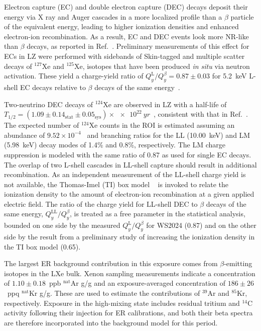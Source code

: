 \documentclass[%
 reprint,
 superscriptaddress,
 amsmath,amssymb,
 prl,
floatfix,
]{revtex4-2}
\newcommand{\RevA}[1]{{\color{black}#1}}
\begin{document}
Electron capture (EC) and double electron capture (DEC) decays deposit their energy via X ray and Auger cascades in a more localized profile than a $\beta$ particle of the equivalent energy, leading to higher ionization densities and enhanced electron-ion recombination. As a result, EC and DEC events look more NR-like than $\beta$ decays, as reported in Ref.~\cite{Xelda-Lshell}. Preliminary measurements of this effect for ECs in LZ were performed with sidebands of Skin-tagged and multiple scatter decays of $^{127}$Xe and $^{125}$Xe, isotopes that have been produced \textit{in situ} via neutron activation. These yield a charge-yield ratio of $Q_y^\text{L} / Q_y^\beta=0.87\pm0.03$ for 5.2~keV L-shell EC decays relative to $\beta$ decays of the same energy~\cite{aalbers2025measurementsmodelsenhancedrecombination}.

Two-neutrino DEC decays of $^{124}$Xe are observed in LZ with a half-life of ${T_{1/2} = (1.09 \pm 0.14_{\text{stat}} \pm 0.05_{\text{sys}}) \times \qty{e22}{yr}}$~\cite{LZ-Xe124}, consistent with that in Ref.~\cite{XENONnT-Xe124_Xe136-2022}. The expected number of $^{124}$Xe counts in the ROI is estimated assuming an abundance of $9.52\times10^{-4}$~\cite{XeAbundances} and branching ratios for the LL (10.00~keV) and LM (5.98~keV) decay modes of 1.4\% and 0.8\%, respectively. The LM charge suppression is modeled with the same ratio of 0.87 as used for single EC decays. The overlap of two L-shell cascades in LL-shell capture should result in additional recombination. As an independent measurement of the LL-shell charge yield is not available, the Thomas-Imel (TI) box model ~\cite{thomas1987recombination, szydagis2022review} is invoked to relate the ionization density to the amount of electron-ion recombination at a given applied electric field. The ratio of the charge yield for LL-shell DEC to $\beta$ decays of the same energy, $Q_y^\text{LL} / Q_y^\beta$, is treated as a free parameter in the statistical analysis, bounded on one side by the measured $Q_y^\text{L} / Q_y^\beta$ for WS2024 (0.87) and on the other side by the result from a preliminary study of increasing the ionization density in the TI box model (0.65).

The largest ER background contribution in this exposure comes from $\beta$-emitting isotopes in the LXe bulk. Xenon sampling measurements indicate a concentration of $1.10\pm0.18$~ppb $^\text{nat}$Ar g/g and an exposure-averaged concentration of $186\pm26$~ppq $^\text{nat}$Kr g/g. These are used to estimate the contributions of $^{39}$Ar and $^{85}$Kr, respectively. Exposure in the high-mixing state includes residual tritium and $^{14}$C activity following \RevA{their injection for ER} calibrations, and both their beta spectra are therefore incorporated into the background model for this period. %
\end{document}
